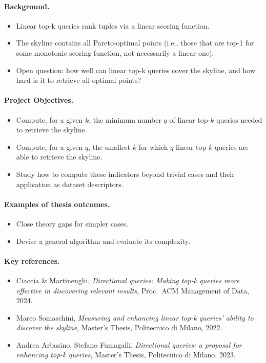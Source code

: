 \documentclass[a4paper,11pt]{article}
\begin{document}
\paragraph{Background.}
\begin{itemize}[nosep]
  \item Linear top-k queries rank tuples via a linear scoring function.
  \item The skyline contains all Pareto-optimal points (i.e., those that are top-1 for some monotonic scoring function, not necessarily a linear one).
  \item Open question: how well can linear top-k queries cover the skyline, and how hard is it to retrieve all optimal points?
\end{itemize}

\paragraph{Project Objectives.}
\begin{itemize}[nosep]
  \item Compute, for a given $k$, the minimum number $q$ of linear top-$k$ queries needed to retrieve the skyline.
  \item Compute, for a given $q$, the smallest $k$ for which $q$ linear top-$k$ queries are able to retrieve the skyline.
  \item Study how to compute these indicators beyond trivial cases and their application as dataset descriptors.
\end{itemize}

\paragraph{Examples of thesis outcomes.}
\begin{itemize}[nosep]
  \item Close theory gaps for simpler cases.
  \item Devise a general algorithm and evaluate its complexity.
\end{itemize}

\paragraph{Key references.}
\begin{itemize}[nosep]
  \item Ciaccia \& Martinenghi, \emph{Directional queries: Making top-k queries more effective in discovering relevant results}, Proc.\ ACM Management of Data, 2024.
  \item Marco Somaschini, \emph{Measuring and enhancing linear top-k queries' ability to discover the skyline}, Master's Thesis, Politecnico di Milano, 2022.
  \item Andrea Arbasino, Stefano Fumagalli, \emph{Directional queries: a proposal for enhancing top-k queries}, Master's Thesis, Politecnico di Milano, 2023.
\end{itemize}
\end{document}
